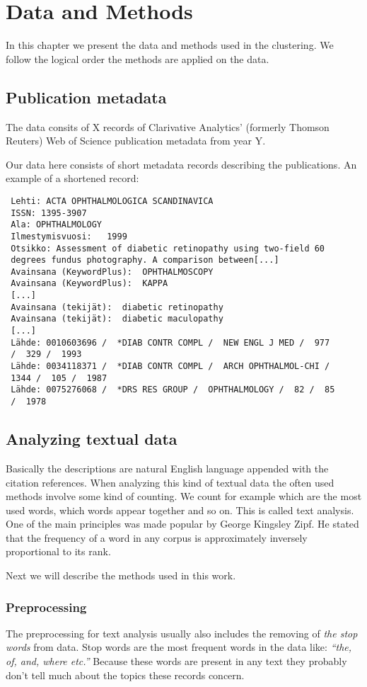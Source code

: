 \chapter{Data and Methods}
\label{chapter:methods}
In this chapter we present the data and methods used in the 
clustering. We follow the logical order the methods are applied on 
the data.

\section{Publication metadata}
The data consits of X records of Clarivative Analytics' 
(formerly Thomson Reuters) Web of Science publication metadata 
from year Y.

Our data here consists of short metadata records describing the 
publications. An example of a shortened record:
\begin{verbatim}
 Lehti: ACTA OPHTHALMOLOGICA SCANDINAVICA
 ISSN: 1395-3907
 Ala: OPHTHALMOLOGY
 Ilmestymisvuosi:   1999
 Otsikko: Assessment of diabetic retinopathy using two-field 60 
 degrees fundus photography. A comparison between[...]
 Avainsana (KeywordPlus):  OPHTHALMOSCOPY
 Avainsana (KeywordPlus):  KAPPA
 [...]
 Avainsana (tekijät):  diabetic retinopathy
 Avainsana (tekijät):  diabetic maculopathy
 [...]
 Lähde: 0010603696 /  *DIAB CONTR COMPL /  NEW ENGL J MED /  977 
 /  329 /  1993
 Lähde: 0034118371 /  *DIAB CONTR COMPL /  ARCH OPHTHALMOL-CHI /  
 1344 /  105 /  1987
 Lähde: 0075276068 /  *DRS RES GROUP /  OPHTHALMOLOGY /  82 /  85 
 /  1978
 \end{verbatim}

 
\section{Analyzing textual data}
Basically the descriptions are natural English 
language appended with the citation references. When analyzing 
this kind of textual data the often used methods involve some 
kind of counting. We count for example which
are the most used words, which words appear together and so on.
This is called text analysis. One of the main principles was made 
popular by George Kingsley Zipf. He stated that the frequency of 
a word in any corpus is approximately inversely proportional to 
its rank. 

Next we will describe the methods used in this work.


\subsection{Preprocessing}
The preprocessing for text analysis usually also includes the 
removing of \emph{the stop words} from data. Stop words are the 
most frequent words in the data like: \emph{``the, of, and, where 
etc.''} Because these words are present in any text they probably 
don't tell much about the topics these records concern. 
\cite{ref_here}



